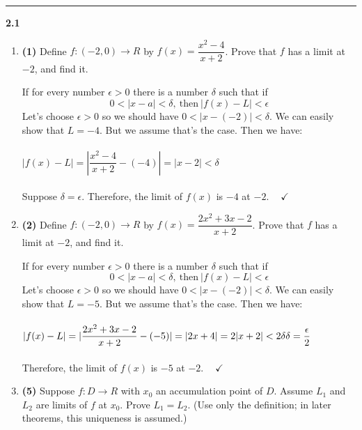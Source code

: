 \documentclass[fleqn]{article}
\begin{document}
  \rule{15cm}{2pt}

  \textbf{2.1}
  \begin{enumerate}
    \item \textbf{(1)} Define $f: (-2, 0) \longrightarrow R$ by $f(x)=\dfrac{x^2-4}{x+2}$. Prove that $f$ has a limit 
    at $-2$, and find it.

      \textcolor{hwColor}{
        If for every number $\epsilon > 0$ there is a number $\delta$ such that if 
        $$
          0<|x-a|< \delta, ~ \textrm{then} ~ |f(x)-L| < \epsilon
        $$
        Let's choose $\epsilon > 0$ so we should have $0 < |x-(-2)| < \delta$. We can easily 
        show that $L=-4$. But we assume that's the case. Then we have:
        \\
        \\
        $
          |f(x)-L|=|\dfrac{x^2-4}{x+2}-(-4)|=|x-2|< \delta
        $
        \\
        \\
        Suppose $\delta = \epsilon$. Therefore, the limit of $f(x)$ is $-4$ at $-2$. $~~~~ \checkmark$
      }
    
    
    \item \textbf{(2)} Define $f: (-2, 0) \longrightarrow R$ by $f(x)=\dfrac{2x^2+3x-2}{x+2}$. Prove that $f$ has a limit 
    at $-2$, and find it.

      \textcolor{hwColor}{
        If for every number $\epsilon > 0$ there is a number $\delta$ such that if 
        $$
          0<|x-a|< \delta, ~ \textrm{then} ~ |f(x)-L| < \epsilon
        $$
        Let's choose $\epsilon > 0$ so we should have $0 < |x-(-2)| < \delta$. We can easily 
        show that $L=-5$. But we assume that's the case. Then we have:
        \\
        \\
        $
          |f(x)-L|=|\dfrac{2x^2+3x-2}{x+2}-(-5)|=|2x+4|=2|x+2|<2 \delta
          \\
          \\
          \delta=\dfrac{\epsilon}{2}
        $
        \\
        \\
        Therefore, the limit of $f(x)$ is $-5$ at $-2$. $~~~~ \checkmark$
      }


    \item \textbf{(5)} Suppose $f: D \longrightarrow R$ with $x_0$ an accumulation point of $D$. Assume $L_1$ and $L_2$ 
    are limits of $f$ at $x_0$. Prove $L_1=L_2$. (Use only the definition; in later theorems, this uniqueness is
    assumed.) 


\end{enumerate}
\end{document}
